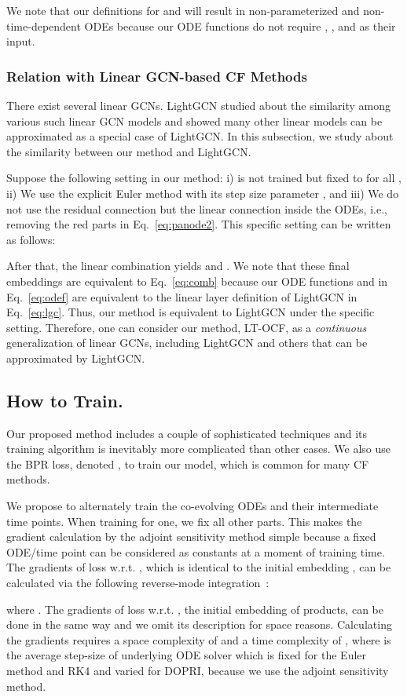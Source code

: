 \documentclass[sigconf]{acmart}
\begin{document}
We note that our definitions for  and  will result in non-parameterized and non-time-dependent ODEs because our ODE functions do not require , , and  as their input.






\subsubsection{Relation with Linear GCN-based CF Methods} There exist several linear GCNs. LightGCN studied about the similarity among various such linear GCN models and showed many other linear models can be approximated as a special case of LightGCN. In this subsection, we study about the similarity between our method and LightGCN.

Suppose the following setting in our method: i)  is not trained but fixed to  for all , ii) We use the explicit Euler method with its step size parameter , and iii) We do not use the residual connection but the linear connection inside the ODEs, i.e., removing the red parts in Eq.~\eqref{eq:panode2}. This specific setting can be written as follows:
\begin{linenomath*}\end{linenomath*}

After that, the linear combination yields  and . We note that these final embeddings are equivalent to Eq.~\eqref{eq:comb} because our ODE functions  and  in Eq.~\eqref{eq:odef} are equivalent to the linear layer definition of LightGCN in Eq.~\eqref{eq:lgc}. Thus, our method is equivalent to LightGCN under the specific setting. Therefore, one can consider our method, LT-OCF, as a \emph{continuous} generalization of linear GCNs, including LightGCN and others that can be approximated by LightGCN.

\subsection{How to Train.}\label{sec:tra}
Our proposed method includes a couple of sophisticated techniques and its training algorithm is inevitably more complicated than other cases. We also use the BPR loss, denoted , to train our model, which is common for many CF methods.

We propose to alternately train the co-evolving ODEs and their intermediate time points. When training for one, we fix all other parts. This makes the gradient calculation by the adjoint sensitivity method simple because a fixed ODE/time point can be considered as constants at a moment of training time. The gradients of loss w.r.t. , which is identical to the initial embedding , can be calculated via the following reverse-mode integration~\cite{NIPS2018_7892}:
\begin{linenomath*}\end{linenomath*}where . The gradients of loss w.r.t. , the initial embedding of products, can be done in the same way and we omit its description for space reasons. Calculating the gradients requires a space complexity of  and a time complexity of , where  is the average step-size of underlying ODE solver which is fixed for the Euler method and RK4 and varied for DOPRI, because we use the adjoint sensitivity method.
\end{document}
